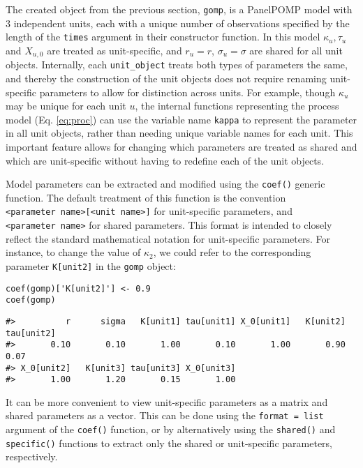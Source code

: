 \noindent The created object from the previous section, \texttt{gomp}, is a PanelPOMP model with 3 independent units, each with a unique number of observations specified by the length of the \texttt{times} argument in their constructor function.
In this model \(\kappa_u, \tau_u\) and \(X_{u, 0}\) are treated as unit-specific, and \(r_u=r\), \(\sigma_u = \sigma\) are shared for all unit objects.
Internally, each \texttt{unit\_object} treats both types of parameters the same, and thereby the construction of the unit objects does not require renaming unit-specific parameters to allow for distinction across units.
For example, though \(\kappa_u\) may be unique for each unit \(u\), the internal functions representing the process model (Eq. \eqref{eq:proc}) can use the variable name \texttt{kappa} to represent the parameter in all unit objects, rather than needing unique variable names for each unit.
This important feature allows for changing which parameters are treated as shared and which are unit-specific without having to redefine each of the unit objects.

Model parameters can be extracted and modified using the \texttt{coef()} generic function.
The default treatment of this function is the convention \texttt{\textless{}parameter\ name\textgreater{}{[}\textless{}unit\ name\textgreater{}{]}} for unit-specific parameters, and \texttt{\textless{}parameter\ name\textgreater{}} for shared parameters.
This format is intended to closely reflect the standard mathematical notation for unit-specific parameters.
For instance, to change the value of \(\kappa_2\), we could refer to the corresponding parameter \texttt{K{[}unit2{]}} in the \texttt{gomp} object:

\begin{verbatim}
coef(gomp)['K[unit2]'] <- 0.9
coef(gomp)
\end{verbatim}

\begin{verbatim}
#>          r      sigma   K[unit1] tau[unit1] X_0[unit1]   K[unit2] tau[unit2] 
#>       0.10       0.10       1.00       0.10       1.00       0.90       0.07 
#> X_0[unit2]   K[unit3] tau[unit3] X_0[unit3] 
#>       1.00       1.20       0.15       1.00
\end{verbatim}

It can be more convenient to view unit-specific parameters as a matrix and shared parameters as a vector.
This can be done using the \texttt{format\ =\ \textquotesingle{}list\textquotesingle{}} argument of the \texttt{coef()} function, or by alternatively using the \texttt{shared()} and \texttt{specific()} functions to extract only the shared or unit-specific parameters, respectively.

